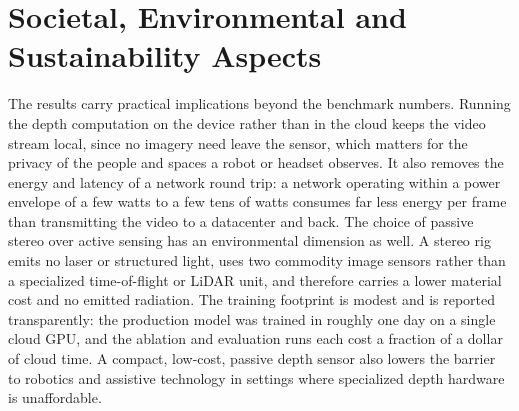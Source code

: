 \section{Societal, Environmental and Sustainability Aspects}
The results carry practical implications beyond the benchmark numbers.
Running the depth computation on the device rather than in the cloud keeps
the video stream local, since no imagery need leave the sensor, which
matters for the privacy of the people and spaces a robot or headset
observes. It also removes the energy and latency of a network round trip:
a network operating within a power envelope of a few watts to a few tens
of watts consumes far less energy per frame than transmitting the video to
a datacenter and back. The choice of passive stereo over active sensing
has an environmental dimension as well. A stereo rig emits no laser or
structured light, uses two commodity image sensors rather than a
specialized time-of-flight or LiDAR unit, and therefore carries a lower
material cost and no emitted radiation. The training footprint is modest
and is reported transparently: the production model was trained in roughly
one day on a single cloud GPU, and the ablation and evaluation runs each
cost a fraction of a dollar of cloud time. A compact, low-cost, passive
depth sensor also lowers the barrier to robotics and assistive technology
in settings where specialized depth hardware is unaffordable.

